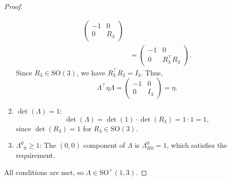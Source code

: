 \documentclass{amsart}
\theoremstyle{definition}
\theoremstyle{remark}
\begin{document}
\begin{proof}
\begin{enumerate}
\begin{align*}
\begin{pmatrix}
            -1 & 0 \\
            0 & R_3
          \end{pmatrix} \\
          &=
          \begin{pmatrix}
            -1 & 0 \\
            0 & R_3^\top R_3
          \end{pmatrix}.
        \end{align*}
      Since $R_3 \in \mathrm{SO}(3)$, we have $R_3^\top R_3 = I_3$.
      Thus,
      \begin{equation*}
        \Lambda^\top\eta \Lambda =
        \begin{pmatrix}
          -1 & 0 \\
          0 & I_3
        \end{pmatrix}
        = \eta.
      \end{equation*}
      \item $\det(\Lambda) = 1$:
      \begin{equation*}
        \det(\Lambda) = \det(1) \cdot \det(R_3) = 1 \cdot 1 = 1,
      \end{equation*}
      since $\det(R_3)=1$ for $R_3 \in \mathrm{SO}(3)$.
      \item $\Lambda^0{}_0 \geq 1$:
      The $(0,0)$ component of $\Lambda$ is $\Lambda_R^0{}_0 = 1$, which satisfies the requirement.
  \end{enumerate}
  All conditions are met, so $\Lambda \in \mathrm{SO}^+(1,3)$.
\end{proof}
\end{document}
